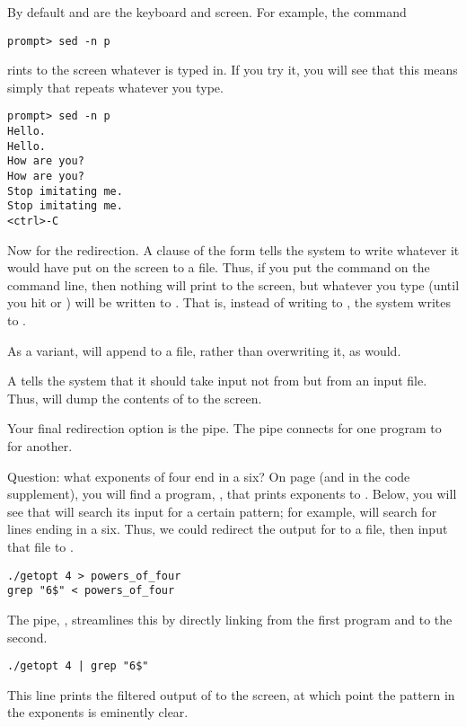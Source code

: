 By default  and  are the keyboard and screen. 
For example, the command
\begin{lstlisting}
prompt> sed -n p
\end{lstlisting}
rints to the screen whatever is typed in. If you
try it, you will see that this means simply that  repeats
whatever you type.
\begin{lstlisting}
prompt> sed -n p
Hello.
Hello.
How are you?
How are you?
Stop imitating me.
Stop imitating me.
<ctrl>-C
\end{lstlisting}
Now for the redirection. A clause of the form  tells the
system to write whatever it would have put on the screen to a file. Thus,
if you put the command  on the command line, then
nothing will print to the screen, but whatever you type (until you hit
 or ) will be written to . That is,
instead of writing to , the system writes to .

As a variant, \bind{>>}  will append to a file, rather than
overwriting it, as  would.

A \bind{<} tells the system that it should take input not from 
but from an input file. Thus,  will dump the
contents of  to the screen. 


Your final redirection option is the pipe. The pipe connects 
for one program to  for another. 

Question: what exponents of four end in a six?  On page \pageref{getopt}
(and in the code supplement), you will find a program, , that prints
exponents to . Below, you will see that  will search
its input for a certain pattern; for example,  will
search  for lines ending in a six. Thus, we could redirect the
output for  to a file, then input that file to .
\begin{lstlisting}
./getopt 4 > powers_of_four
grep "6$" < powers_of_four
\end{lstlisting}
The pipe, \ci{|}, streamlines this by directly linking  from
the first program and  to the second.
\begin{lstlisting}
./getopt 4 | grep "6$" 
\end{lstlisting}
This line prints the filtered output of  to the screen, at
which point the pattern in the exponents is eminently clear.

